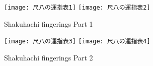
\begin{figure}[H]
	\centering
	\texttt{[image: 尺八の運指表1]}
	\vspace{1cm}
	\texttt{[image: 尺八の運指表2]}
	\caption{Shakuhachi fingerings Part 1}
	\label{fig:shakuhachi_fingerings_1}
\end{figure}

\begin{figure}[H]
	\centering
	\texttt{[image: 尺八の運指表3]}
	\vspace{1cm}
	\texttt{[image: 尺八の運指表4]}
	\caption{Shakuhachi fingerings Part 2}
	\label{fig:shakuhachi_fingerings_2}
\end{figure}
